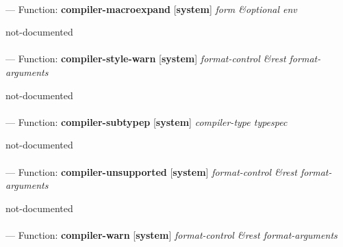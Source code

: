 \paragraph{}
\label{SYSTEM:COMPILER-MACROEXPAND}
--- Function: \textbf{compiler-macroexpand} [\textbf{system}] \textit{form \&optional env}

\begin{adjustwidth}{5em}{5em}
not-documented
\end{adjustwidth}

\paragraph{}
\label{SYSTEM:COMPILER-STYLE-WARN}
--- Function: \textbf{compiler-style-warn} [\textbf{system}] \textit{format-control \&rest format-arguments}

\begin{adjustwidth}{5em}{5em}
not-documented
\end{adjustwidth}

\paragraph{}
\label{SYSTEM:COMPILER-SUBTYPEP}
--- Function: \textbf{compiler-subtypep} [\textbf{system}] \textit{compiler-type typespec}

\begin{adjustwidth}{5em}{5em}
not-documented
\end{adjustwidth}

\paragraph{}
\label{SYSTEM:COMPILER-UNSUPPORTED}
--- Function: \textbf{compiler-unsupported} [\textbf{system}] \textit{format-control \&rest format-arguments}

\begin{adjustwidth}{5em}{5em}
not-documented
\end{adjustwidth}

\paragraph{}
\label{SYSTEM:COMPILER-WARN}
--- Function: \textbf{compiler-warn} [\textbf{system}] \textit{format-control \&rest format-arguments}

